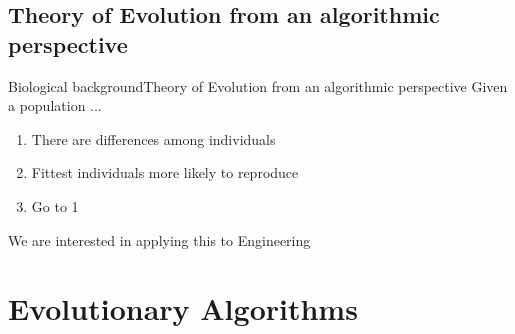 \documentclass[10pt,compress]{beamer} %
\begin{document}
\subsection{{Theory of Evolution from an algorithmic perspective}}
\begin{frame}{Biological background}{Theory of Evolution from an algorithmic perspective}
	Given a population ...
	\begin{enumerate}
	\item There are differences among individuals
	\item Fittest individuals more likely to reproduce
	\item Go to 1
	\end{enumerate}
	We are interested in applying this to Engineering
\end{frame}


\section{Evolutionary Algorithms}
\end{document}
